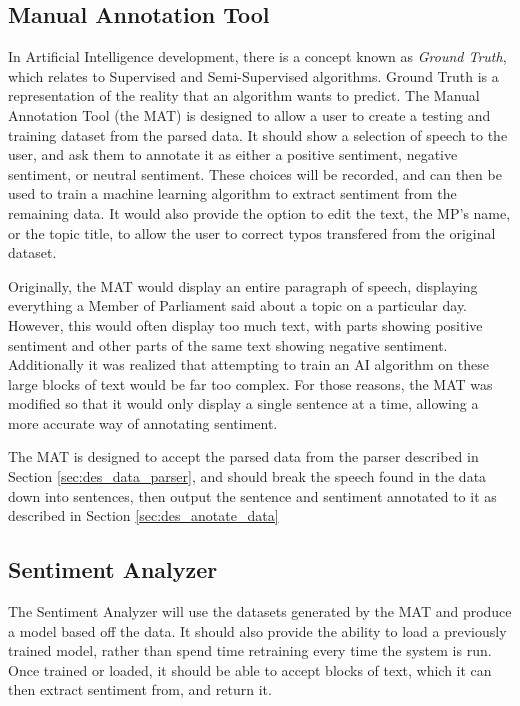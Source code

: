 \subsection{Manual Annotation Tool}
\label{sec:des_annotation_tool}
In Artificial Intelligence development, there is a concept known as \emph{Ground Truth}, which relates to Supervised and Semi-Supervised algorithms. Ground Truth is a representation of the reality that an algorithm wants to predict. 
The Manual Annotation Tool (the MAT) is designed to allow a user to create a testing and training dataset from the parsed data. It should show a selection of speech to the user, and ask them to annotate it as either a positive sentiment, negative sentiment, or neutral sentiment. These choices will be recorded, and can then be used to train a machine learning algorithm to extract sentiment from the remaining data. It would also provide the option to edit the text, the MP's name, or the topic title, to allow the user to correct typos transfered from the original dataset.

Originally, the MAT would display an entire paragraph of speech, displaying everything a Member of Parliament said about a topic on a particular day. However, this would often display too much text, with parts showing positive sentiment and other parts of the same text showing negative sentiment. Additionally it was realized that attempting to train an AI algorithm on these large blocks of text would be far too complex. For those reasons, the MAT was modified so that it would only display a single sentence at a time, allowing a more accurate way of annotating sentiment.

The MAT is designed to accept the parsed data from the parser described in Section \ref{sec:des_data_parser}, and should break the speech found in the data down into sentences, then output the sentence and sentiment annotated to it as described in Section \ref{sec:des_anotate_data}

\subsection{Sentiment Analyzer}
\label{sec:des_sentiment_analyzer}
The Sentiment Analyzer will use the datasets generated by the MAT and produce a model based off the data. It should also provide the ability to load a previously trained model, rather than spend time retraining every time the system is run. Once trained or loaded, it should be able to accept blocks of text, which it can then extract sentiment from, and return it.

